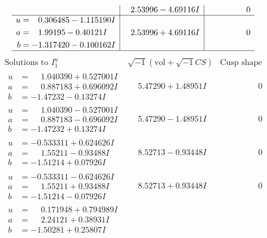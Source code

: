 \documentclass[1p]{elsarticle_modified}
\theoremstyle{definition}
\newcommand{\I}{\sqrt{-1}}
\begin{document}
$$\begin{array}{c|c|c}
 & \phantom{-}2.53996 - 4.69116 I & \phantom{-0.000000 } 0 \\ \hline\begin{aligned}
u &= \phantom{-}0.306485 - 1.115190 I \\
a &= \phantom{-}1.99195 - 0.40121 I \\
b &= -1.317420 - 0.100162 I\end{aligned}
 & \phantom{-}2.53996 + 4.69116 I & \phantom{-0.000000 } 0\\
 \hline 
 \end{array}$$\newpage$$\begin{array}{c|c|c}  
\text{Solutions to }I^u_{1}& \I (\text{vol} + \sqrt{-1}CS) & \text{Cusp shape}\\
 \hline 
\begin{aligned}
u &= \phantom{-}1.040390 + 0.527001 I \\
a &= \phantom{-}0.887183 + 0.696092 I \\
b &= -1.47232 - 0.13274 I\end{aligned}
 & \phantom{-}5.47290 + 1.48951 I & \phantom{-0.000000 } 0 \\ \hline\begin{aligned}
u &= \phantom{-}1.040390 - 0.527001 I \\
a &= \phantom{-}0.887183 - 0.696092 I \\
b &= -1.47232 + 0.13274 I\end{aligned}
 & \phantom{-}5.47290 - 1.48951 I & \phantom{-0.000000 } 0 \\ \hline\begin{aligned}
u &= -0.533311 + 0.624626 I \\
a &= \phantom{-}1.55211 - 0.93488 I \\
b &= -1.51214 + 0.07926 I\end{aligned}
 & \phantom{-}8.52713 - 0.93448 I & \phantom{-0.000000 } 0 \\ \hline\begin{aligned}
u &= -0.533311 - 0.624626 I \\
a &= \phantom{-}1.55211 + 0.93488 I \\
b &= -1.51214 - 0.07926 I\end{aligned}
 & \phantom{-}8.52713 + 0.93448 I & \phantom{-0.000000 } 0 \\ \hline\begin{aligned}
u &= \phantom{-}0.171948 + 0.794989 I \\
a &= \phantom{-}2.24121 + 0.38931 I \\
b &= -1.50281 + 0.25807 I\end{aligned}

\end{array}$$
\end{document}

